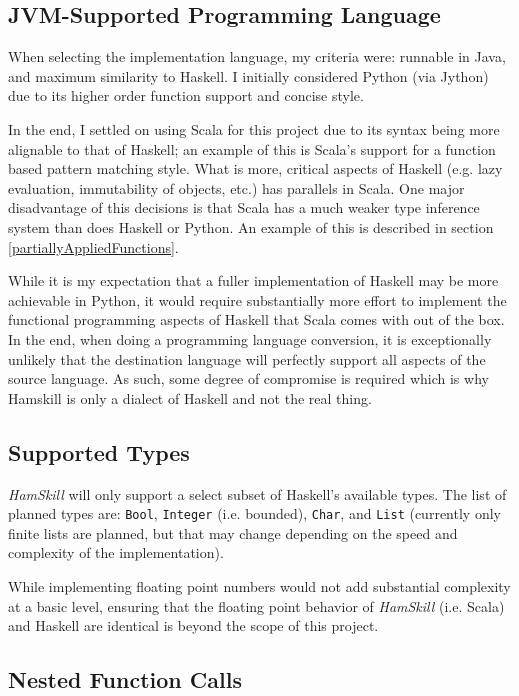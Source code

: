 \documentclass{report}
\begin{document}
\subsection{JVM-Supported Programming Language}

When selecting the implementation language, my criteria were: runnable in Java, and maximum similarity to Haskell.  I initially considered Python (via Jython) due to its higher order function support and concise style.  

In the end, I settled on using Scala for this project due to its syntax being more alignable to that of Haskell; an example of this is Scala's support for a function based pattern matching style.  What is more, critical aspects of Haskell (e.g. lazy evaluation, immutability of objects, etc.) has parallels in Scala.  One major disadvantage of this decisions is that Scala has a much weaker type inference system than does Haskell or Python.  An example of this is described in section \ref{partiallyAppliedFunctions}.  

While it is my expectation that a fuller implementation of Haskell may be more achievable in Python, it would require substantially more effort to implement the functional programming aspects of Haskell that Scala comes with out of the box.  In the end, when doing a programming language conversion, it is exceptionally unlikely that the destination language will perfectly support all aspects of the source language.  As such, some degree of compromise is required which is why Hamskill is only a dialect of Haskell and not the real thing.

\subsection{Supported Types}

\emph{HamSkill} will only support a select subset of Haskell's available types.  The list of planned types are: {\tt Bool}, {\tt Integer} (i.e. bounded), {\tt Char}, and {\tt List} (currently only finite lists are planned, but that may change depending on the speed and complexity of the implementation).

While implementing floating point numbers would not add substantial complexity at a basic level, ensuring that the floating point behavior of \emph{HamSkill} (i.e. Scala) and Haskell are identical is beyond the scope of this project.

\subsection{Nested Function Calls}
\end{document}
